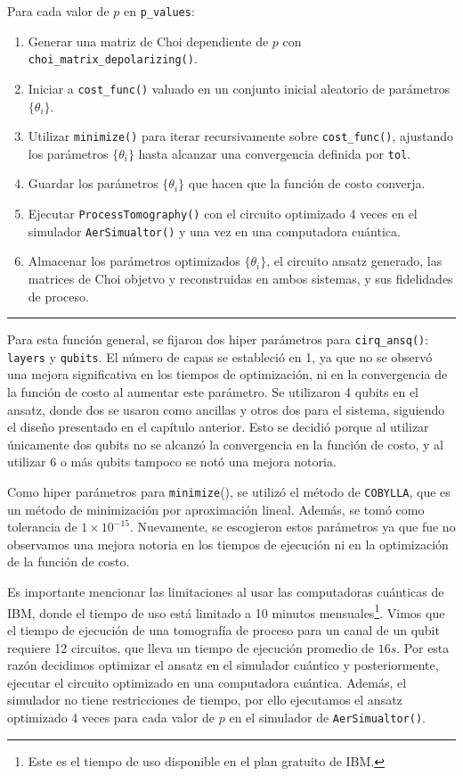 \documentclass[letterpaper,12pt]{thesisECFM}
\theoremstyle{plain}
\theoremstyle{definition}
\theoremstyle{remark}
\newcommand{\1}{\mathbb{1}}
\begin{document}
Para cada valor de $p$ en \texttt{p\_values}: 
\begin{enumerate}
    \item Generar una matriz de Choi dependiente de $p$ con \texttt{choi\_matrix\_depolarizing()}.
    \item Iniciar a  \texttt{cost\_func()} valuado en un conjunto inicial
aleatorio de parámetros $\{\theta_i\}$. 
   \item Utilizar \texttt{minimize()} para iterar recursivamente sobre
\texttt{cost\_func()}, ajustando los parámetros $\{\theta_i\}$ hasta alcanzar
una convergencia definida por \texttt{tol}.
   \item Guardar los parámetros $\{ \theta_i\}$ que hacen que la función de
costo converja. 
   \item Ejecutar \texttt{ProcessTomography()} con el circuito optimizado 4
veces en el simulador \texttt{AerSimualtor()} y una vez en una computadora
cuántica. 
    \item Almacenar los parámetros optimizados $\{ \theta_i\}$, el circuito
ansatz generado, las matrices de Choi objetvo y reconstruidas en ambos
sistemas, y sus fidelidades de proceso. 
\end{enumerate}
\vspace{-.5cm}
\noindent\rule{\textwidth}{1mm}
Para esta función general, se fijaron dos hiper parámetros para
\texttt{cirq\_ansq()}: \texttt{layers} y \texttt{qubits}. El número de capas se
estableció en 1, ya que no se observó una mejora significativa en los tiempos
de optimización, ni en la convergencia de la función de costo al aumentar este
parámetro. Se utilizaron 4 qubits en el ansatz, donde dos se usaron como
ancillas y otros dos para el sistema, siguiendo el diseño presentado en el
capítulo anterior. Esto se decidió porque al utilizar únicamente dos qubits no
se alcanzó la convergencia en la función de costo, y al utilizar 6 o más qubits
tampoco se notó una mejora notoria.

Como hiper parámetros para \texttt{minimize}(), se utilizó el método de
\texttt{COBYLLA}, que es un método de minimización por aproximación lineal.
Además, se tomó como tolerancia de $1\times 10^{-15}$. Nuevamente, se
escogieron estos parámetros ya que fue no observamos una mejora notoria en los
tiempos de ejecución ni en la optimización de la función de costo.

Es importante mencionar las limitaciones al usar las computadoras cuánticas de
IBM, donde el tiempo de uso está limitado a 10 minutos mensuales\footnote{Este
es el tiempo de uso disponible en el plan gratuito de IBM.}. Vimos que el
tiempo de ejecución de una tomografía de proceso para un canal de un qubit
requiere 12 circuitos, que lleva un tiempo de ejecución promedio de $16s$. Por
esta razón decidimos optimizar el ansatz en el simulador cuántico y
posteriormente, ejecutar el circuito optimizado en una computadora cuántica.
Además, el simulador no tiene restricciones de tiempo, por ello ejecutamos el
ansatz optimizado 4 veces para cada valor de $p$ en el simulador de
\texttt{AerSimualtor()}.
\end{document}
